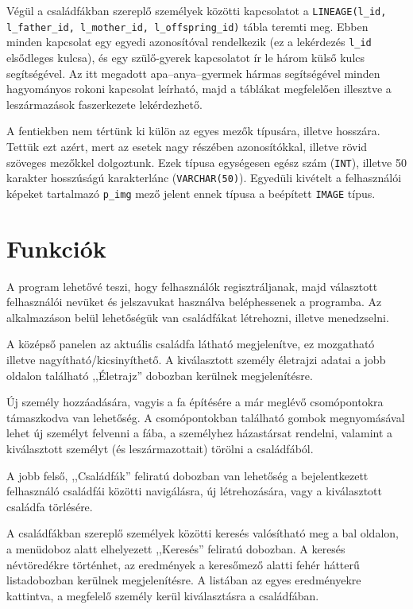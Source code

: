 Végül a családfákban szereplő személyek közötti kapcsolatot a \texttt{LINEAGE(l\_id, l\_father\_id, l\_mother\_id, l\_offspring\_id)} tábla teremti meg. Ebben minden kapcsolat egy egyedi azonosítóval rendelkezik (ez a lekérdezés \texttt{l\_id} elsődleges kulcsa), és egy szülő-gyerek kapcsolatot ír le három külső kulcs segítségével. Az itt megadott apa--anya--gyermek hármas segítségével minden hagyományos rokoni kapcsolat leírható, majd a táblákat megfelelően illesztve a leszármazások faszerkezete lekérdezhető.

\bigskip

A fentiekben nem tértünk ki külön az egyes mezők típusára, illetve hosszára. Tettük ezt azért, mert az esetek nagy részében azonosítókkal, illetve rövid szöveges mezőkkel dolgoztunk. Ezek típusa egységesen egész szám (\texttt{INT}), illetve 50 karakter hosszúságú karakterlánc (\texttt{VARCHAR(50)}). Egyedüli kivételt a felhasználói képeket tartalmazó \texttt{p\_img} mező jelent ennek típusa a beépített \texttt{IMAGE} típus.

\section{Funkciók}\label{sect:rsz_funkciok}

A program lehetővé teszi, hogy felhasználók regisztráljanak, majd választott felhasználói nevüket és jelszavukat használva beléphessenek a programba. Az alkalmazáson belül lehetőségük van családfákat létrehozni, illetve menedzselni.

A középső panelen az aktuális családfa látható megjelenítve, ez mozgatható illetve nagyítható/kicsinyíthető. A kiválasztott személy életrajzi adatai a jobb oldalon található ,,Életrajz'' dobozban kerülnek megjelenítésre.

Új személy hozzáadására, vagyis a fa építésére a már meglévő csomópontokra támaszkodva van lehetőség. A csomópontokban található gombok megnyomásával lehet új személyt felvenni a fába, a személyhez házastársat rendelni, valamint a kiválasztott személyt (és leszármazottait) törölni a családfából.

A jobb felső, ,,Családfák'' feliratú dobozban van lehetőség a bejelentkezett felhasználó családfái közötti navigálásra, új létrehozására, vagy a kiválasztott családfa törlésére.

A családfákban szereplő személyek közötti keresés valósítható meg a bal oldalon, a menüdoboz alatt elhelyezett ,,Keresés'' feliratú dobozban. A keresés névtöredékre történhet, az eredmények a keresőmező alatti fehér hátterű listadobozban kerülnek megjelenítésre. A listában az egyes eredményekre kattintva, a megfelelő személy kerül kiválasztásra a családfában.
